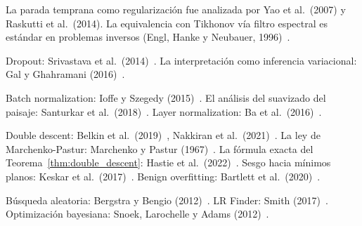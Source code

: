 \begin{notasbib}
La parada temprana como regularización fue analizada por Yao et al.\
(2007) y Raskutti et al.\ (2014). La equivalencia con Tikhonov vía
filtro espectral es estándar en problemas inversos (Engl, Hanke y
Neubauer, 1996)~\cite{engl1996regularization}.

Dropout: Srivastava et al.\
(2014)~\cite{srivastava2014dropout}. La interpretación como inferencia
variacional: Gal y Ghahramani (2016)~\cite{gal2016dropout}.

Batch normalization: Ioffe y Szegedy
(2015)~\cite{ioffe2015batch}. El análisis del suavizado del paisaje:
Santurkar et al.\ (2018)~\cite{santurkar2018how}. Layer normalization:
Ba et al.\ (2016)~\cite{ba2016layer}.

Double descent: Belkin et al.\
(2019)~\cite{belkin2019reconciling}, Nakkiran et al.\
(2021)~\cite{nakkiran2021deep}. La ley de Marchenko-Pastur:
Marchenko y Pastur (1967)~\cite{marchenko1967distribution}. La fórmula
exacta del Teorema~\ref{thm:double_descent}: Hastie et al.\
(2022)~\cite{hastie2022surprises}. Sesgo hacia mínimos planos: Keskar
et al.\ (2017)~\cite{keskar2017large}. Benign overfitting: Bartlett et
al.\ (2020)~\cite{bartlett2020benign}.

Búsqueda aleatoria: Bergstra y Bengio
(2012)~\cite{bergstra2012random}. LR Finder: Smith
(2017)~\cite{smith2017cyclical}. Optimización bayesiana: Snoek,
Larochelle y Adams (2012)~\cite{snoek2012practical}.
\end{notasbib}


